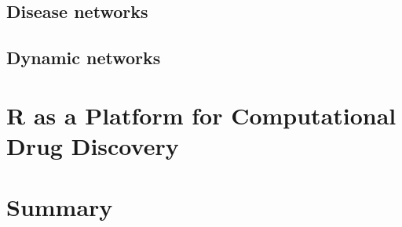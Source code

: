 \documentclass[12pt,letterpaper]{article}
\begin{document}
\subsection{Disease networks}
\label{sec:disease-networks}

\subsection{Dynamic networks}
\label{sec:dynamic-networks}


\section{R as a Platform for Computational Drug Discovery}
\label{sec:r-as-platform}

\section{Summary}
\label{sec:summary}


\end{document}
